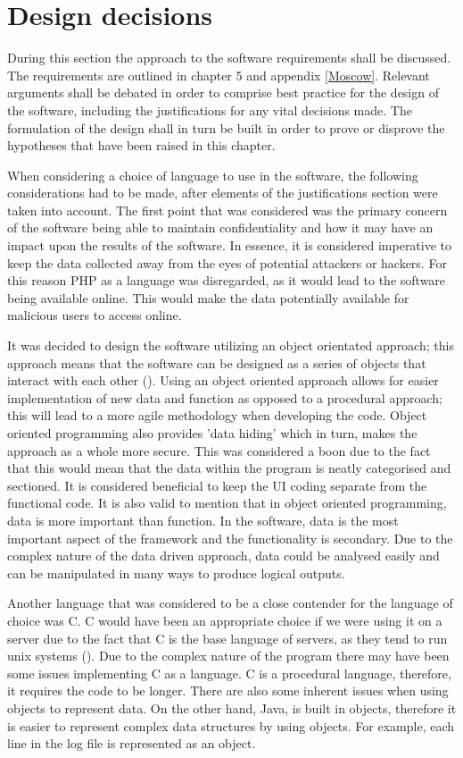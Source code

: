 \section{Design decisions}

During this section the approach to the software requirements shall be discussed. The requirements are outlined in chapter 5 and appendix \ref{Moscow}. Relevant arguments shall be debated in order to comprise best practice for the design of the software, including the justifications for any vital decisions made. The formulation of the design shall in turn be built in order to prove or disprove the hypotheses that have been raised in this chapter. 

When considering a choice of language to use in the software, the following considerations had to be made, after elements of the justifications section were taken into account. The first point that was considered was the primary concern of the software being able to maintain confidentiality and how it may have an impact upon the results of the software. In essence, it is considered imperative to keep the data collected away from the eyes of potential attackers or hackers. For this reason PHP as a language was disregarded, as it would lead to the software being available online. This would make the data potentially available for malicious users to access online. 

It was decided to design the software utilizing an object orientated approach; this approach means that the software can be designed as a series of objects that interact with each other (\cite{OOP}). Using an object oriented approach allows for easier implementation of new data and function as opposed to a procedural approach; this will lead to a more agile methodology when developing the code. Object oriented programming also provides 'data hiding' which in turn, makes the approach as a whole more secure. This was considered a boon due to the fact that this would mean that the data within the program is neatly categorised and sectioned. It is considered beneficial to keep the UI coding separate from the functional code. It is also valid to mention that in object oriented programming, data is more important than function. In the software, data is the most important aspect of the framework and the functionality is secondary. Due to the complex nature of the data driven approach, data could be analysed easily and can be manipulated in many ways to produce logical outputs.

Another language that was considered to be a close contender for the language of choice was C. C would have been an appropriate choice if we were using it on a server due to the fact that C is the base language of servers, as they tend to run unix systems (\cite{ehost}). Due to the complex nature of the program there may have been some issues implementing C as a language. C is a procedural language, therefore, it requires the code to be longer. There are also some inherent issues when using objects to represent data. On the other hand, Java, is built in objects, therefore it is easier to represent complex data structures by using objects. For example, each line in the log file is represented as an object. 

